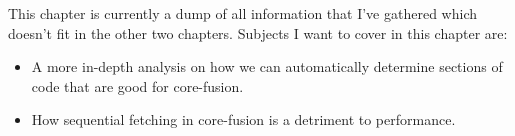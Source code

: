 This chapter is currently a dump of all information that I've gathered which doesn't fit in the other two chapters.
Subjects I want to cover in this chapter are:
\begin{itemize}
\item A more in-depth analysis on how we can automatically determine sections of code that are good for core-fusion.
\item How sequential fetching in core-fusion is a detriment to performance.
\end{itemize}